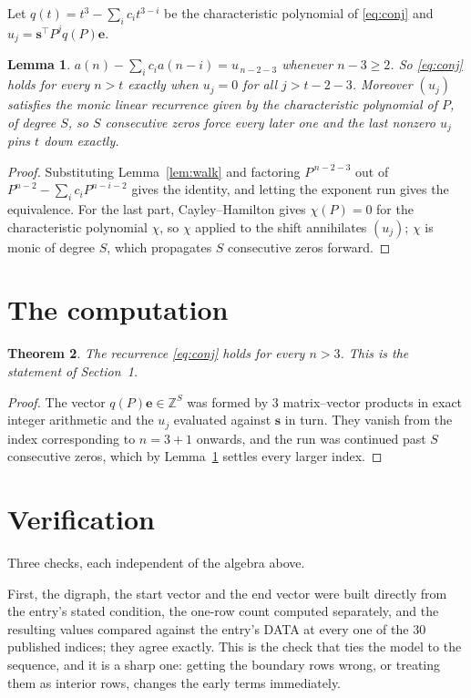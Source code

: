 \documentclass[11pt,a4paper]{article}
\theoremstyle{plain}
\newtheorem{theorem}{Theorem}
\newtheorem{lemma}[theorem]{Lemma}
\theoremstyle{definition}
\begin{document}
Let $q(t)=t^{3}-\sum_i c_i t^{3-i}$ be the characteristic polynomial of
\eqref{eq:conj} and $u_j=\mathbf{s}^{\!\top}P^{j}q(P)\mathbf{e}$.

\begin{lemma}\label{lem:crit}
$a(n)-\sum_i c_i a(n-i)=u_{\,n-2-3}$ whenever $n-3\ge2$. So \eqref{eq:conj}
holds for every $n>t$ exactly when $u_j=0$ for all $j>t-2-3$. Moreover $(u_j)$
satisfies the monic linear recurrence given by the characteristic polynomial of $P$, of
degree $S$, so $S$ consecutive zeros force every later one and the last nonzero $u_j$ pins
$t$ down exactly.
\end{lemma}

\begin{proof}
Substituting Lemma~\ref{lem:walk} and factoring $P^{\,n-2-3}$ out of
$P^{n-2}-\sum_i c_i P^{n-i-2}$ gives the identity, and letting the exponent run gives the
equivalence. For the last part, Cayley--Hamilton gives $\chi(P)=0$ for the characteristic
polynomial $\chi$, so $\chi$ applied to the shift annihilates $(u_j)$; $\chi$ is monic of
degree $S$, which propagates $S$ consecutive zeros forward.
\end{proof}

\section{The computation}

\begin{theorem}
The recurrence \eqref{eq:conj} holds for every $n>3$. This is the statement of
Section~1.
\end{theorem}

\begin{proof}
The vector $q(P)\mathbf{e}\in\mathbb{Z}^{S}$ was formed by $3$ matrix--vector
products in exact integer arithmetic and the $u_j$ evaluated against $\mathbf{s}$ in turn.
They vanish from the index corresponding to $n=3+1$ onwards, and the run was continued
past $S$ consecutive zeros, which by Lemma~\ref{lem:crit} settles every larger index.
\end{proof}

\section{Verification}

Three checks, each independent of the algebra above.

First, the digraph, the start vector and the end vector were built directly from the
entry's stated condition, the one-row count computed separately, and the resulting values
compared against the entry's DATA at every one of the $30$ published indices; they
agree exactly. This is the check that ties the model to the sequence, and it is a sharp one:
getting the boundary rows wrong, or treating them as interior rows, changes the early terms
immediately.
\end{document}
